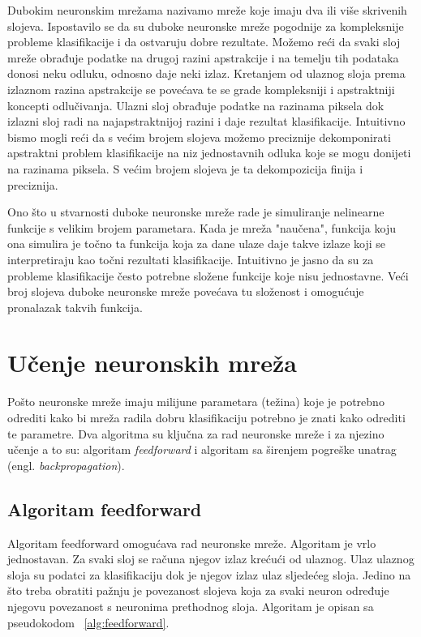 \documentclass[times, utf8, zavrsni, numeric]{fer}
\begin{document}
Dubokim neuronskim mrežama nazivamo mreže koje imaju dva ili više skrivenih slojeva. Ispostavilo se da su duboke neuronske mreže pogodnije za kompleksnije probleme klasifikacije i da ostvaruju dobre rezultate. Možemo reći da svaki sloj mreže obrađuje podatke na drugoj razini apstrakcije i na temelju tih podataka donosi neku odluku, odnosno daje neki izlaz. Kretanjem od ulaznog sloja prema izlaznom razina apstrakcije se povećava te se grade kompleksniji i apstraktniji koncepti odlučivanja. Ulazni sloj obrađuje podatke na razinama piksela dok izlazni sloj radi na najapstraktnijoj razini i daje rezultat klasifikacije. Intuitivno bismo mogli reći da s većim brojem slojeva možemo preciznije dekomponirati apstraktni problem klasifikacije na niz jednostavnih odluka koje se mogu donijeti na razinama piksela. S većim brojem slojeva je ta dekompozicija finija i preciznija.

Ono što u stvarnosti duboke neuronske mreže rade je simuliranje nelinearne funkcije s velikim brojem parametara. Kada je mreža "naučena", funkcija koju ona simulira je točno ta funkcija koja za dane ulaze daje takve izlaze koji se interpretiraju kao točni rezultati klasifikacije. Intuitivno je jasno da su za probleme klasifikacije često potrebne složene funkcije koje nisu jednostavne. Veći broj slojeva duboke neuronske mreže povećava tu složenost i omogućuje pronalazak takvih funkcija.

\section{Učenje neuronskih mreža}
Pošto neuronske mreže imaju milijune parametara (težina) koje je potrebno odrediti kako bi mreža radila dobru klasifikaciju potrebno je znati kako odrediti te parametre. Dva algoritma su ključna za rad neuronske mreže i za njezino učenje a to su: algoritam \textit{feedforward} i algoritam sa širenjem pogreške unatrag (engl. \textit{backpropagation}).

\subsection{Algoritam feedforward}
Algoritam feedforward omogućava rad neuronske mreže. Algoritam je vrlo jednostavan. Za svaki sloj se  računa njegov izlaz krećući od ulaznog. Ulaz ulaznog sloja su podatci za klasifikaciju dok je njegov izlaz ulaz sljedećeg sloja. Jedino na što treba obratiti pažnju je povezanost slojeva koja za svaki neuron određuje njegovu povezanost s neuronima prethodnog sloja. Algoritam je opisan sa pseudokodom ~\ref{alg:feedforward}.
\end{document}
